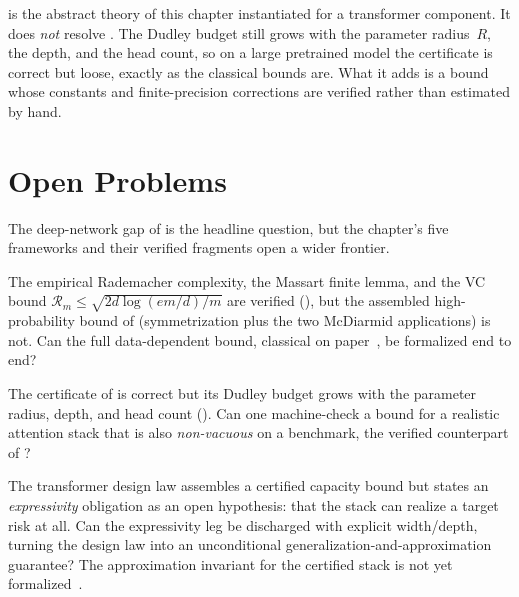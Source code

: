 \begin{remark}
\label{rmk:certified-attention}
 is the abstract theory of this chapter
instantiated for a transformer component.  It does \emph{not} resolve
.  The Dudley budget still grows with the parameter
radius~$R$, the depth, and the head count, so on a large pretrained model the
certificate is correct but loose, exactly as the classical bounds are.  What
it adds is a bound whose constants and finite-precision corrections are
verified rather than estimated by hand.
\end{remark}



\section{Open Problems}
\label{sec:generalization-open}

The deep-network gap of  is the headline question, but
the chapter's five frameworks and their verified fragments open a wider
frontier.

\begin{openprob}
\label{op:formalize-rademacher}
The empirical Rademacher complexity, the Massart finite lemma, and the VC
bound $\mathcal{R}_m \leq \sqrt{2d\log(em/d)/m}$ are verified
(), but the assembled high-probability bound
of  (symmetrization plus the two McDiarmid
applications) is not.  Can the full data-dependent bound, classical on
paper~\cite{BartlettMendelson2002}, be formalized end to end?
\end{openprob}

\begin{openprob}
\label{op:tighten-certified-attention}
The certificate of  is correct but its Dudley
budget grows with the parameter radius, depth, and head count
().  Can one machine-check a bound for a
realistic attention stack that is also \emph{non-vacuous} on a benchmark, the
verified counterpart of ?
\end{openprob}

\begin{openprob}
\label{op:expressivity-leg}
The transformer design law assembles a certified capacity bound but states an
\emph{expressivity} obligation as an open hypothesis: that the stack can
realize a target risk at all.  Can the expressivity leg be discharged with
explicit width/depth, turning the design law into an unconditional
generalization-and-approximation guarantee?  The approximation invariant for
the certified stack is not yet formalized~\cite{XuRaginsky2017}.
\end{openprob}

